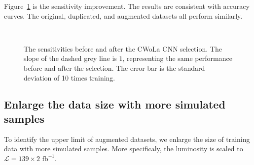 \documentclass[12pt]{article}
\begin{document}
		Figure~\ref{fig:sensitivity_improvement_new_workflow} is the sensitivity improvement. The results are consistent with accuracy curves. The original, duplicated, and augmented datasets all perform similarly.
		\begin{figure}[htpb]
			\centering
			 \\
			\caption{The sensitivities before and after the CWoLa CNN selection. The slope of the dashed grey line is $1$, representing the same performance before and after the selection. The error bar is the standard deviation of 10 times training.}
			\label{fig:sensitivity_improvement_new_workflow}
		\end{figure}
	\subsection{Enlarge the data size with more simulated samples}%
	\label{sub:enlarge_the_data_size_with_more_simulated_samples}
		To identify the upper limit of augmented datasets, we enlarge the size of training data with more simulated samples. More specificaly, the luminosity is scaled to $\mathcal{L} = 139 \times 2 \text{ fb}^{-1}$.
\end{document}
